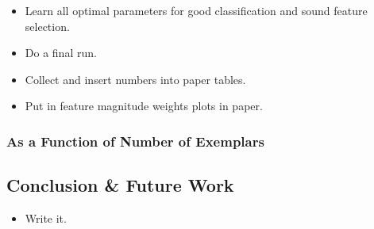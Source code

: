 \begin{itemize}
\tightlist
\item
  Learn all optimal parameters for good classification and sound feature
  selection.
\item
  Do a final run.
\item
  Collect and insert numbers into paper tables.
\item
  Put in feature magnitude weights plots in paper.
\end{itemize}

\subsubsection{As a Function of Number of
Exemplars}\label{as-a-function-of-number-of-exemplars}

\subsection{Conclusion \& Future Work}\label{conclusion-future-work}

\begin{itemize}
\tightlist
\item
  Write it.
\end{itemize}
